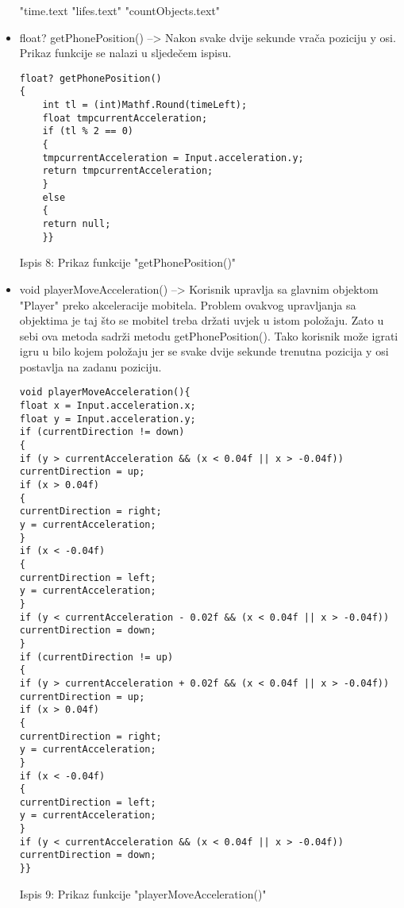 \begin{itemize}
\subitem"time.text
\subitem"lifes.text"
\subitem"countObjects.text"

\item float? getPhonePosition() --> Nakon svake dvije sekunde vrača poziciju y osi. Prikaz funkcije se nalazi u sljedečem ispisu.

\begin{verbatim}
float? getPhonePosition()
{
	int tl = (int)Mathf.Round(timeLeft);
	float tmpcurrentAcceleration;
	if (tl % 2 == 0)
	{
	tmpcurrentAcceleration = Input.acceleration.y;
	return tmpcurrentAcceleration;
	}
	else
	{
	return null;
	}}

\end{verbatim}
\begin{center}
	
	Ispis 8: Prikaz funkcije "getPhonePosition()"
\end{center}



\item void playerMoveAcceleration() --> Korisnik upravlja sa glavnim objektom "Player" preko akceleracije mobitela. Problem ovakvog upravljanja sa objektima je taj što se mobitel treba držati uvjek u istom položaju. Zato u sebi ova metoda sadrži metodu getPhonePosition(). Tako korisnik može igrati igru u bilo kojem položaju jer se svake dvije sekunde trenutna pozicija y osi postavlja na zadanu poziciju.


\begin{verbatim}
void playerMoveAcceleration(){
float x = Input.acceleration.x;
float y = Input.acceleration.y;
if (currentDirection != down)
{
if (y > currentAcceleration && (x < 0.04f || x > -0.04f))
currentDirection = up;
if (x > 0.04f)
{
currentDirection = right;
y = currentAcceleration;
}
if (x < -0.04f)
{
currentDirection = left;
y = currentAcceleration;
}
if (y < currentAcceleration - 0.02f && (x < 0.04f || x > -0.04f))
currentDirection = down;
}
if (currentDirection != up)
{
if (y > currentAcceleration + 0.02f && (x < 0.04f || x > -0.04f))
currentDirection = up;
if (x > 0.04f)
{
currentDirection = right;
y = currentAcceleration;
}
if (x < -0.04f)
{
currentDirection = left;
y = currentAcceleration;
}
if (y < currentAcceleration && (x < 0.04f || x > -0.04f))
currentDirection = down;
}}
\end{verbatim}
\begin{center}
	
	Ispis 9: Prikaz funkcije "playerMoveAcceleration()"
\end{center}


\end{itemize}
